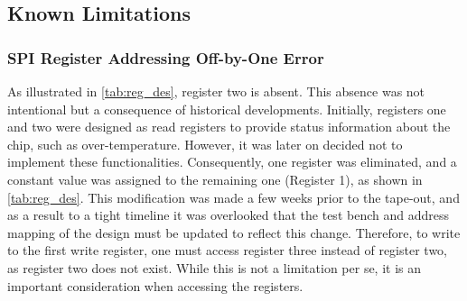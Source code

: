 \subsection{Known Limitations}

\subsubsection{SPI Register Addressing Off-by-One Error}
As illustrated in \autoref{tab:reg_des}, register two is absent. This absence was not intentional but a consequence of historical developments. Initially, registers one and two were designed as read registers to provide status information about the chip, such as over-temperature. However, it was later on decided not to implement these functionalities. Consequently, one register was eliminated, and a constant value was assigned to the remaining one (Register 1), as shown in \autoref{tab:reg_des}.
This modification was made a few weeks prior to the tape-out, and as a result to a tight timeline it was overlooked that the test bench and address mapping of the design must be updated to reflect this change. Therefore, to write to the first write register, one must access register three instead of register two, as register two does not exist. While this is not a limitation per se, it is an important consideration when accessing the registers.

